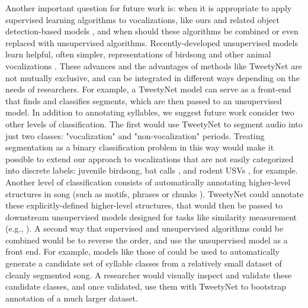 \documentclass[9pt,lineno]{elife}
\begin{document}
Another important question for future work is: 
when it is appropriate to apply supervised learning algorithms to vocalizations, like ours 
and related object detection-based models \citep{coffey_deepsqueak_2019, fonseca2021analysis}, 
and when should these algorithms be combined or even replaced with 
unsupervised algorithms. 
Recently-developed unsupervised models learn helpful, often simpler, 
representations of birdsong and other animal vocalizations 
\citep{goffinetLowdimensionalLearnedFeature2021,sainburg2019animal,sainburgFindingVisualizingQuantifying2020}. 
These advances and the advantages of methods like TweetyNet are not mutually exclusive, 
and can be integrated in different ways depending on the needs of researchers. 
For example, a TweetyNet model can serve as a front-end 
that finds and classifies segments, which are then passed to an unsupervised model. 
In addition to annotating syllables, 
we suggest future work consider two other levels of classification. 
The first would use TweetyNet to segment audio 
into just two classes: "vocalization" and "non-vocalization" periods. 
Treating segmentation as a binary classification problem in this way 
would make it possible to extend our approach 
to vocalizations that are not easily categorized 
into discrete labels: juvenile birdsong, bat calls \citep{prat2017annotated}, 
and rodent USVs \citep{tachibanaUSVSEGRobustMethod2020}, for example. 
Another level of classification consists of automatically annotating higher-level structures in song 
(such as motifs, phrases \citep{markowitz_long-range_2013} or chunks \citep{takahasiStatisticalProsodicCues2010,kakishitaEthologicalDataMining2009}). 
TweetyNet could annotate these explicitly-defined higher-level structures, 
that would then be passed to downstream unsupervised models 
designed for tasks like similarity measurement 
(e.g., \citep{goffinetLowdimensionalLearnedFeature2021,sainburg2019animal,sainburgFindingVisualizingQuantifying2020}). 
A second way that supervised and unsupervised algorithms could be combined 
would be to reverse the order, and use the unsupervised model as a front end. 
For example, models like those of \cite{sainburgFindingVisualizingQuantifying2020} could be used to 
automatically generate a candidate set of syllable classes 
from a relatively small dataset of cleanly segmented song. 
A researcher would visually inspect and validate these candidate classes, 
and once validated, use them with TweetyNet to bootstrap annotation of a much larger dataset.
\end{document}
